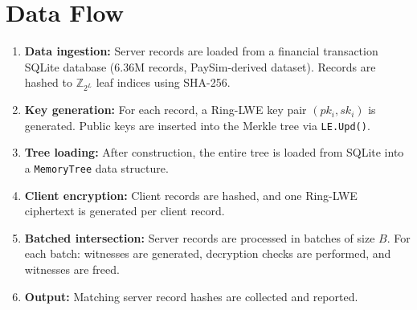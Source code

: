 \section{Data Flow}

\begin{enumerate}
    \item \textbf{Data ingestion:} Server records are loaded from a financial
          transaction SQLite database (6.36M records, PaySim-derived dataset).
          Records are hashed to $\mathbb{Z}_{2^L}$ leaf indices using SHA-256.
    \item \textbf{Key generation:} For each record, a Ring-LWE key pair
          $(pk_i, sk_i)$ is generated. Public keys are inserted into the Merkle
          tree via \texttt{LE.Upd()}.
    \item \textbf{Tree loading:} After construction, the entire tree is loaded
          from SQLite into a \texttt{MemoryTree} data structure.
    \item \textbf{Client encryption:} Client records are hashed, and one
          Ring-LWE ciphertext is generated per client record.
    \item \textbf{Batched intersection:} Server records are processed in batches
          of size $B$. For each batch: witnesses are generated, decryption
          checks are performed, and witnesses are freed.
    \item \textbf{Output:} Matching server record hashes are collected and
          reported.
\end{enumerate}

\clearpage
